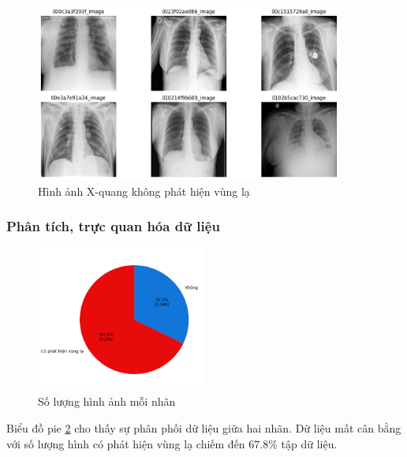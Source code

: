     \begin{figure}[htp]
        \centering
        \includegraphics[width=0.90\textwidth]{images/Img_lung_label0_exp.png}
        \caption{Hình ảnh X-quang không phát hiện vùng lạ}
        \label{fig:Img_lung_label0_exp}
    \end{figure}
    \FloatBarrier

\subsubsection{Phân tích, trực quan hóa dữ liệu}
   

    \begin{figure}[htp]
        \centering
        \includegraphics[width=0.50\textwidth]{images/Img_lung_label.png}
        \caption{Số lượng hình ảnh mỗi nhãn}
        \label{fig:Img_lung_label}
    \end{figure}
    \FloatBarrier

    Biểu đồ pie \ref{fig:Img_lung_label} cho thấy sự phân phối dữ liệu giữa hai nhãn. Dữ liệu mất cân bằng với số lượng hình có phát hiện vùng lạ chiếm đến 67.8\% tập dữ liệu.

